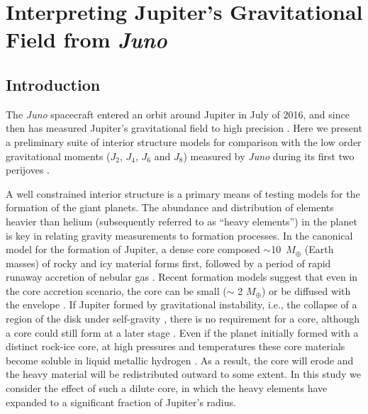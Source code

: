 \chapter{Interpreting Jupiter's Gravitational Field from \textit{Juno}}\label{chap8}

\section{Introduction} \label{sec:intro}

The \textit{Juno} spacecraft entered an orbit around Jupiter in July of 2016, and
since then has measured Jupiter's gravitational field to high precision
\citep{bolton2017}.  Here we present a preliminary suite of interior structure models
for comparison with the low order gravitational moments ($J_2$, $J_4$, $J_6$ and
$J_8$) measured by \textit{Juno} during its first two perijoves \citep{Folkner2017}. 

A well constrained interior structure is  a primary means of testing models for
the formation of the giant planets. The abundance and distribution of elements
heavier than helium  (subsequently referred to as ``heavy elements'') in the
planet is key in relating gravity measurements to formation processes. In the
canonical model for the formation of Jupiter, a dense core composed
$\sim$10~$M_\oplus$ (Earth masses) of rocky and icy material forms first,
followed by a period of rapid runaway accretion of nebular gas
\citep{Mizuno1978,Bodenheimer1986,Pollack1996}. Recent formation models suggest
that even in the core accretion scenario, the core can be small ($\sim$ 2
$M_\oplus$) or be diffused with the envelope
\citep{venturini2016,lozovsky2017}. If Jupiter formed by gravitational
instability, i.e., the collapse of a region of the disk under self-gravity
\citep{Boss1997}, there is no requirement for a core, although a core could
still form at a later stage \citep{helled2014}.  Even if the planet initially
formed with a distinct rock-ice core, at high pressures and temperatures these
core materials become soluble in liquid metallic hydrogen
\citep{Stevenson1985,wilson2012a,Wilson2012b,Wahl2013,Gonzalez2013}. As a
result, the core will erode and the heavy material will be redistributed
outward to some extent. In this study we consider the effect of such a dilute
core, in which the heavy elements have expanded to a significant fraction of
Jupiter's radius.

